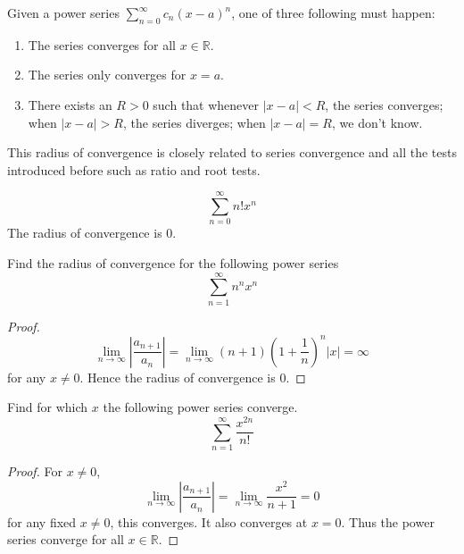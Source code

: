 \documentclass[openany]{book}
\newcommand{\R}{\mathbb{R}}
\begin{document}
\begin{prop}
    Given a power series $\sum_{n=0}^\infty c_n(x-a)^n$, one of three following must happen:
    \begin{enumerate}
        \item The series converges for all $x\in\R$.
        \item The series only converges for $x=a$.
        \item There exists an $R>0$ such that whenever $|x-a|<R$, the series converges; when $|x-a|>R$, the series diverges; when $|x-a|=R$, we don't know.
    \end{enumerate}
\end{prop}
This radius of convergence is closely related to series convergence and all the tests introduced before such as ratio and root tests.
\begin{example}
    \begin{equation*}
        \sum_{n=0}^\infty n!x^n
    \end{equation*}
    The radius of convergence is $0$.
\end{example}



\begin{prob}
    Find the radius of convergence for the following power series
    \begin{equation*}
        \sum_{n=1}^{\infty} n^n x^n
    \end{equation*}
\end{prob}
\begin{proof}
    \begin{equation*}
        \lim_{n\to\infty}\left|\frac{a_{n+1}}{a_n}\right|=\lim_{n\to\infty}(n+1)\left(1+\frac{1}{n}\right)^n|x|=\infty
    \end{equation*}
    for any $x\neq 0$. Hence the radius of convergence is $0$.
\end{proof}


\begin{prob}
    Find for which $x$ the following power series converge.
    \begin{equation*}
        \sum_{n=1}^{\infty} \frac{x^{2n}}{n!}
    \end{equation*}
\end{prob}
\begin{proof}
    For $x\neq 0$,
    \begin{equation*}
        \lim_{n\to\infty}\left|\frac{a_{n+1}}{a_n}\right|=\lim_{n\to\infty}\frac{x^2}{n+1}=0
    \end{equation*}
    for any fixed $x\neq 0$, this converges. It also converges at $x=0$. Thus the power series converge for all $x\in\R$.
\end{proof}
\end{document}
